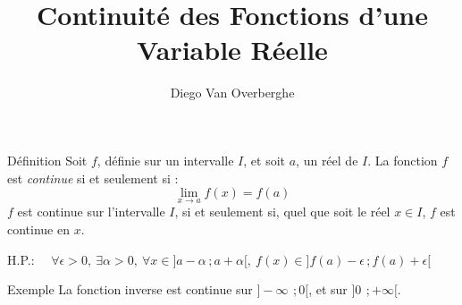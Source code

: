 \documentclass{cours}
\title{Continuité des Fonctions d'une Variable Réelle}
\author{Diego Van Overberghe}
\begin{document}

    \begin{Gpartie}{Définition}
        Soit $f$, définie sur un intervalle $I$, et soit $a$, un réel de $I$.
        La fonction $f$ est \emph{continue} si et seulement si : \[\boxed{\lim_{x \to a} f(x)=f(a)}\]
        $f$ est continue sur l'intervalle $I$, si et seulement si, quel que soit le réel $x\in I$, $f$ est continue en $x$.

        H.P.: $\quad\forall\epsilon >0,~\exists\alpha >0,~\forall x\in\big]a-\alpha\,;a+\alpha\big[,~f(x)\in\big]f(a)-\epsilon\,;f(a)+\epsilon\big[$
        \begin{Spartie}{Exemple}
            La fonction inverse est continue sur $\big]-\infty\,~;0\big[$, et sur $\big]0\,~;+\infty\big[$.


\end{Spartie}
\end{Gpartie}
\end{document}
